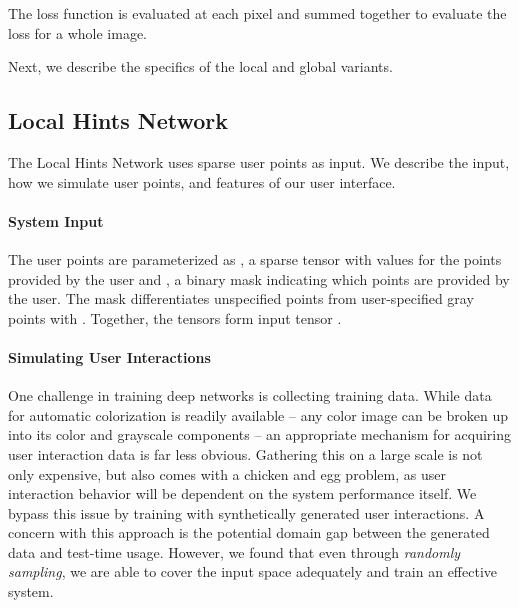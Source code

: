 \documentclass[acmtog,authorversion]{acmart}
\begin{document}
\vspace{-2mm}

\vspace{-1mm}

The loss function  is evaluated at each pixel and summed together to evaluate the loss  for a whole image.

\vspace{-2mm}


\noindent Next, we describe the specifics of the local and global variants.


\subsection{Local Hints Network}
\label{sec:localhintsnet}

The Local Hints Network uses sparse user points as input. We describe the input, how we simulate user points, and features of our user interface.

\paragraph{System Input}
\label{sec:lhn-input}
The user points are parameterized as , a sparse tensor with  values for the points provided by the user and , a binary mask indicating which points are provided by the user. The mask differentiates unspecified points from user-specified gray points with . Together, the tensors form input tensor .

\paragraph{Simulating User Interactions} One challenge in training deep networks is collecting training data. While data for automatic colorization is readily available -- any color image can be broken up into its color and grayscale components -- an appropriate mechanism for acquiring user interaction data is far less obvious. Gathering this on a large scale is not only expensive, but also comes with a chicken and egg problem, as user interaction behavior will be dependent on the system performance itself. We bypass this issue by training with synthetically generated user interactions. A concern with this approach is the potential domain gap between the generated data and test-time usage. However, we found that even through \textit{randomly sampling}, we are able to cover the input space adequately and train an effective system.
\end{document}
